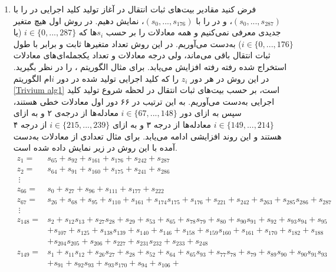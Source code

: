 \begin{enumerate}
	\item  
	فرض کنید مقادیر بیت‌های ثبات انتقال در آغاز تولید کلید اجرایی در 
	را با 
	$(s_{0},...,s_{287})$، 
	و در 
	را با 
	$(s_{0},...,s_{176})$، 
	نمایش دهیم. در روش اول  هیچ متغیر جدیدی معرفی نمی‌کنیم و همه معادلات را بر حسب
	$s_{i}$ها 
	که 
	$i\in \{0,...,287\}$
	(یا 
	$i\in \{0,...,176\}$)
	به‌دست می‌آوریم. در این روش تعداد متغیرها ثابت و برابر با طول ثبات انتقال باقی می‌ماند، ولی درجه معادلات و تعداد یکجمله‌ای‌های معادلات استخراج شده رفته رفته افزایش می‌یابد.  برای مثال الگوریتم 
	، 
	را در نظر بگیرید.  در این روش در هر دور 
	$z_{i}$
	را که کلید اجرایی تولید شده در دور 
	$i$ام
	الگوریتم  
	\ref{Trivium alg1} 
	است، بر حسب بیت‌های  ثبات  انتقال در لحظه شروع تولید کلید اجرایی به‌دست می‌آوریم. به این‌ ترتیب در  ۶۶ دور اول معادلات خطی هستند، سپس به ازای دور 
	$i\in \{67,...,148\}$
	معادله‌ها از درجه‌ی ۲ و به ازای 
	$i\in \{149,...,214\}$
	معادله‌ها از درجه ۳  و به ازای  
	$i \in \{215,..., 239\}$
	از درجه ۴  هستند و این روند  افزایشی ادامه می‌یابد. برای مثال تعدادی از معادلات به‌دست آمده با این روش در زیر نمایش داده شده است. 
	\begin{align*}
	z_{1} =& s_{65} + s_{92} + s_{161} + s_{176} + s_{242} + s_{287}\\
	z_{2} =& s_{64} + s_{91} + s_{160} + s_{175} + s_{241} + s_{286}\\
	\ \vdots\\
	z_{66} =& s_{0} + s_{27} + s_{96} + s_{111} + s_{177} + s_{222}\\
	z_{67} =& s_{26} + s_{68} + s_{95} + s_{110} + s_{161} + s_{174} s_{175} + s_{176} + s_{221} + s_{242} + s_{263} + s_{285} s_{286} + s_{287}\\
	\ \vdots\\
	z_{148} =& s_{2} + s_{12} s_{13} + s_{27} s_{28} + s_{29} + s_{53} + s_{65} + s_{78} s_{79} + s_{80} + s_{90} s_{91} + s_{92} + s_{93} s_{94} + s_{95}\\
	&+ s_{107} + s_{125} + s_{138} s_{139} + s_{140} + s_{146} + s_{158} + s_{159} s_{160} + s_{161} + s_{170} + s_{182} + s_{188}\\ 
	&+ s_{204} s_{205} + s_{206} + s_{227} + s_{231} s_{232} + s_{233} + s_{248}\\
	z_{149} =& s_{1} + s_{11} s_{12} + s_{26} s_{27} + s_{28} + s_{52} + s_{64} +
	s_{65} s_{93} + s_{77} s_{78} + s_{79} + s_{89} s_{90} + s_{90} s_{91}
	s_{93}\\
	&+ s_{91} + s_{92} s_{93} + s_{93} s_{170} + s_{94} + s_{106} +

\end{align*}
\end{enumerate}
